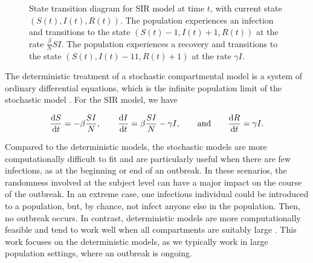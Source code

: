 \begin{figure}
    \centering
    \caption{State transition diagram for SIR model at time \( t \), with current state \( (S(t), I(t), R(t)) \).
    The population experiences an infection and transitions to the state \( (S(t)-1, I(t)+1, R(t)) \) at the rate \( \frac{\beta}{N}SI \).
    The population experiences a recovery and transitions to the state \( (S(t), I(t)-11, R(t)+1) \) at the rate \( \gamma I \).
    }
    \label{ch_2:fig:stocastic_SIR}
\end{figure}

The deterministic treatment of a stochastic compartmental model is a system of ordinary differential equations, which is the infinite population limit of the stochastic model \citep{Greenwood2009}.
For the SIR model, we have 

\begin{equation}
    \frac{\mathrm{d} S}{\mathrm{d} t} = -\beta \frac{SI}{N}, \qquad
    \frac{\mathrm{d} I}{\mathrm{d} t} = \beta \frac{SI}{N} - \gamma I, \qquad
    \text{and} \qquad
    \frac{\mathrm{d} R}{\mathrm{d} t} = \gamma I
    \text{.}
\label{ch_2:SIR_diff_eq}
\end{equation}

Compared to the deterministic models, the stochastic models are more computationally difficult to fit and are particularly useful when there are few infections, as at the beginning or end of an outbreak.
In these scenarios, the randomness involved at the subject level can have a major impact on the course of the outbreak.
In an extreme case, one infectious individual could be introduced to a population, but, by chance, not infect anyone else in the population.
Then, no outbreak occurs.
In contrast, deterministic models are more computationally feasible and tend to work well when all compartments are suitably large \citep{doi:10.1098/rspb.2015.0347}.
This work focuses on the deterministic models, as we typically work in large population settings, where an outbreak is ongoing.

